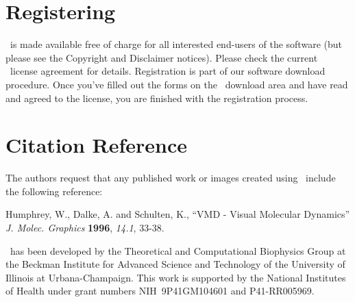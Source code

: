 
%
%
%

\section{Registering \VMD}

\VMD\ is made available free of charge for all interested 
end-users of the software (but please see the Copyright and 
Disclaimer notices).  Please check the current \VMD\ license 
agreement for details.  Registration is part of our software download
procedure.  Once you've filled out the forms on the \VMD\ download
area and have read and agreed to the license, you are finished with
the registration process.

\section{Citation Reference}
The authors request that any published work or images created using \VMD\ 
include the following reference:

\begin{description}
  \item{Humphrey, W., Dalke, A. and Schulten, K.,} ``VMD - Visual Molecular
Dynamics'' {\em J. Molec. Graphics} {\bf 1996}, {\em 14.1}, 33-38.
\end{description}

\VMD\ has been developed by the 
Theoretical and Computational Biophysics Group at the
Beckman Institute for Advanced Science and Technology of the
University of Illinois at Urbana-Champaign.
This work is supported by the National Institutes of Health under
grant numbers NIH~9P41GM104601 and P41-RR005969.

